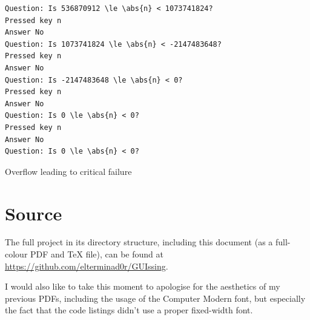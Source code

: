 \documentclass[a4paper,11pt]{article}
\newenvironment{longlisting}
{\addvspace{\baselineskip}\captionsetup{type=listing}}
{\addvspace{\baselineskip}}
\begin{document}
\begin{longlisting}
\begin{verbatim}
Question: Is 536870912 \le \abs{n} < 1073741824?
Pressed key n
Answer No
Question: Is 1073741824 \le \abs{n} < -2147483648?
Pressed key n
Answer No
Question: Is -2147483648 \le \abs{n} < 0?
Pressed key n
Answer No
Question: Is 0 \le \abs{n} < 0?
Pressed key n
Answer No
Question: Is 0 \le \abs{n} < 0?
\end{verbatim}
\caption{Overflow leading to critical failure}\label{lst:overflow}
\end{longlisting}

    \section{Source}

    The full project in its directory structure, including this document (as a
    full-colour PDF and \TeX{} file), can be found at
    \url{https://github.com/elterminad0r/GUIssing}.

    I would also like to take this moment to apologise for the aesthetics of my
    previous PDFs, including the usage of the Computer Modern font, but
    especially the fact that the code listings didn't use a proper fixed-width
    font.
\end{document}
